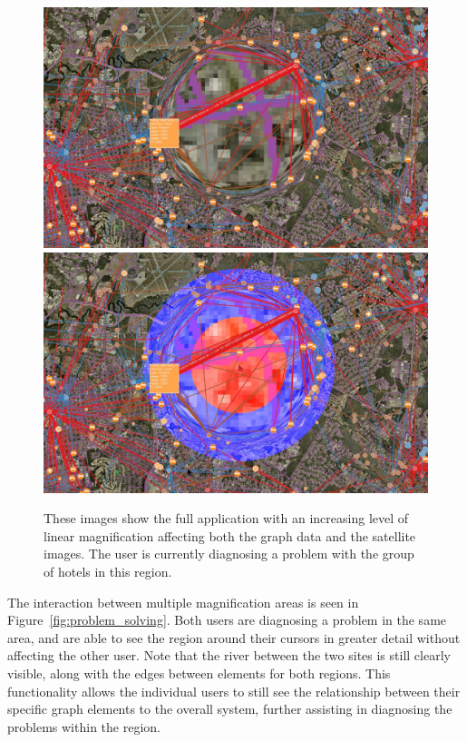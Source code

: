 \begin{figure}[htp]
    \includegraphics[width=0.49\linewidth]{img/s_r_g_30_zoom.jpg}
    \includegraphics[width=0.49\linewidth]{img/s_r_g_30_zoom_color.jpg}
    \caption[Full Application with 1.6x to 17.4x Linear Magnification]{These images show the full application with an increasing level of linear magnification affecting both the graph data and the satellite images. The user is currently diagnosing a problem with the group of hotels in this region.}
    \label{fig:s_r_g_mag}
\end{figure}

The interaction between multiple magnification areas is seen in Figure~\ref{fig:problem_solving}. Both users are diagnosing a problem in the same area, and are able to see the region around their cursors in greater detail without affecting the other user. Note that the river between the two sites is still clearly visible, along with the edges between elements for both regions. This functionality allows the individual users to still see the relationship between their specific graph
elements to the overall system, further assisting in diagnosing the problems within the region.

